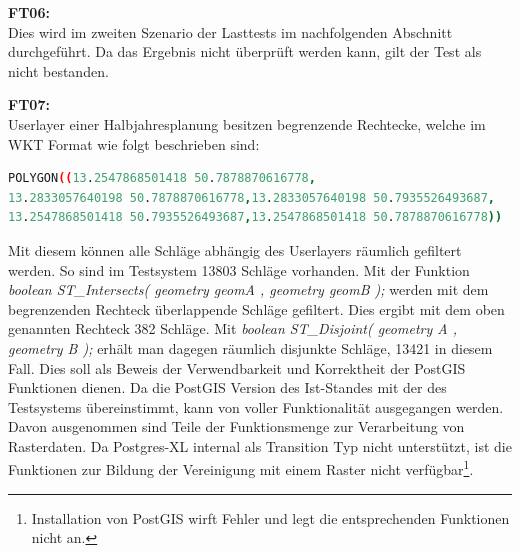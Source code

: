 \textbf{FT06:}\\
Dies wird im zweiten Szenario der Lasttests im nachfolgenden Abschnitt durchgeführt.
Da das Ergebnis nicht überprüft werden kann, gilt der Test als nicht bestanden.

\textbf{FT07:}\\
Userlayer einer Halbjahresplanung besitzen begrenzende Rechtecke, welche im WKT Format wie folgt beschrieben sind:
\begin{lstlisting}[language=bash,caption={Begrenzendes Rechteck im WKT Format},label=lst:koordinaten]
POLYGON((13.2547868501418 50.7878870616778,
13.2833057640198 50.7878870616778,13.2833057640198 50.7935526493687,
13.2547868501418 50.7935526493687,13.2547868501418 50.7878870616778))
\end{lstlisting}
Mit diesem können alle Schläge abhängig des Userlayers räumlich gefiltert werden.
So sind im Testsystem 13803 Schläge vorhanden.
Mit der Funktion \textit{boolean ST\_{}Intersects( geometry geomA , geometry geomB );} werden mit dem begrenzenden Rechteck überlappende Schläge gefiltert.
Dies ergibt mit dem oben genannten Rechteck 382 Schläge.
Mit \textit{boolean ST\_{}Disjoint( geometry A , geometry B );} erhält man dagegen räumlich disjunkte Schläge, 13421 in diesem Fall.
Dies soll als Beweis der Verwendbarkeit und Korrektheit der PostGIS Funktionen dienen.
Da die PostGIS Version des Ist-Standes mit der des Testsystems übereinstimmt, kann von voller Funktionalität  ausgegangen werden.
Davon ausgenommen sind Teile der Funktionsmenge zur Verarbeitung von Rasterdaten.
Da Postgres-XL internal als Transition Typ nicht unterstützt, ist die Funktionen zur Bildung der Vereinigung mit einem Raster nicht verfügbar\footnote{Installation von PostGIS wirft Fehler und legt die entsprechenden Funktionen nicht an.}.



